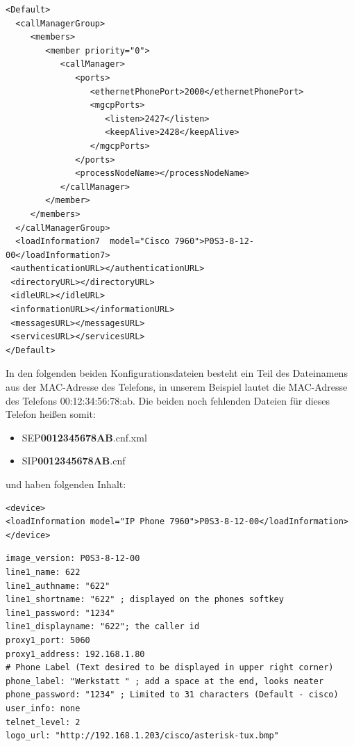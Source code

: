 \documentclass[a4paper,12pt]{scrbook}
\begin{document}
\begin{lstlisting}[caption={XMLDefault.cnf.xml},label=lst:7960sipdefaultcnf]
<Default>
  <callManagerGroup>
     <members>
        <member priority="0">
           <callManager>
              <ports>
                 <ethernetPhonePort>2000</ethernetPhonePort>
                 <mgcpPorts>
                    <listen>2427</listen>
                    <keepAlive>2428</keepAlive>
                 </mgcpPorts>
              </ports>
              <processNodeName></processNodeName>
           </callManager>
        </member>
     </members>
  </callManagerGroup>
  <loadInformation7  model="Cisco 7960">P0S3-8-12-00</loadInformation7>
 <authenticationURL></authenticationURL>
 <directoryURL></directoryURL>
 <idleURL></idleURL>
 <informationURL></informationURL>
 <messagesURL></messagesURL>
 <servicesURL></servicesURL>
</Default>
\end{lstlisting}

In den folgenden beiden Konfigurationsdateien besteht ein Teil des Dateinamens aus der MAC-Adresse des Telefons, in unserem Beispiel lautet die MAC-Adresse des Telefons 00:12:34:56:78:ab.
Die beiden noch fehlenden Dateien für dieses Telefon heißen somit:
\begin{itemize}
 \item SEP\textbf{0012345678AB}.cnf.xml
 \item SIP\textbf{0012345678AB}.cnf
\end{itemize}
und haben folgenden Inhalt:

\begin{lstlisting}[caption={SEP\textbf{0012345678AB}.cnf.xml},label=lst:7960sep0012345678abcnfxml]
<device>
<loadInformation model="IP Phone 7960">P0S3-8-12-00</loadInformation>
</device>
\end{lstlisting}

\begin{lstlisting}[caption={SIP\textbf{0012345678AB}.cnf},label=lst:7960sip0012345678abcnf]
image_version: P0S3-8-12-00
line1_name: 622
line1_authname: "622"
line1_shortname: "622" ; displayed on the phones softkey
line1_password: "1234"
line1_displayname: "622"; the caller id
proxy1_port: 5060
proxy1_address: 192.168.1.80
# Phone Label (Text desired to be displayed in upper right corner)
phone_label: "Werkstatt " ; add a space at the end, looks neater
phone_password: "1234" ; Limited to 31 characters (Default - cisco)
user_info: none
telnet_level: 2
logo_url: "http://192.168.1.203/cisco/asterisk-tux.bmp"
\end{lstlisting}
\end{document}
